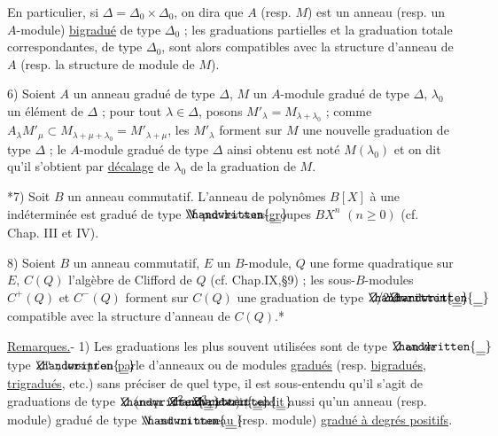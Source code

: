En particulier, si $\Delta=\Delta_0\times\Delta_0$, on dira que $A$ (resp. $M$) est un anneau (resp. un $A$-module) \uline{bigradué} de type $\Delta_0$ ; les graduations partielles et la graduation totale correspondantes, de type $\Delta_0$, sont alors compatibles avec la structure d'anneau de $A$ (resp. la structure de module de $M$).

6) Soient $A$ un anneau gradué de type $\Delta$, $M$ un $A$-module gradué de type $\Delta$, $\lambda_0$ un élément de $\Delta$ ; pour tout $\lambda\in\Delta$, posons $M'_\lambda=M_{\lambda+\lambda_0}$ ; comme $A_\lambda M'_\mu\subset M_{\lambda+\mu+\lambda_0}=M'_{\lambda+\mu}$, les $M'_\lambda$ forment sur $M$ une nouvelle graduation de type $\Delta$ ; le $A$-module gradué de type $\Delta$ ainsi obtenu est noté $M(\lambda_0)$ et on dit qu'il s'obtient par \uline{décalage} de $\lambda_0$ de la graduation de $M$.

*7) Soit $B$ un anneau commutatif. L'anneau de polynômes $B[X]$ à une indéterminée est gradué de type $\rlap{\ensuremath{\handwritten{\underline{\underline{\phantom{N}}}}}}N$ par les sous-groupes $BX^n$ $(n\geq 0)$ (cf. Chap. III et IV).

8) Soient $B$ un anneau commutatif, $E$ un $B$-module, $Q$ une forme quadratique sur $E$, $C(Q)$ l'algèbre de Clifford de $Q$ (cf. Chap.IX,\S{}9) ; les sous-$B$-modules $C^+(Q)$ et $C^-(Q)$ forment sur $C(Q)$ une graduation de type $\rlap{\ensuremath{\handwritten{\underline{\underline{\phantom{Z}}}}}}Z/2\rlap{\ensuremath{\handwritten{\underline{\underline{\phantom{Z}}}}}}Z$ compatible avec la structure d'anneau de $C(Q)$.*

\uline{Remarques.}- 1) Les graduations les plus souvent utilisées sont de type $\rlap{\ensuremath{\handwritten{\underline{\underline{\phantom{Z}}}}}}Z$ ou de type $\rlap{\ensuremath{\handwritten{\underline{\underline{\phantom{Z}}}}}}Z^n$ ; lorsqu'on parle d'anneaux ou de modules \uline{gradués} (resp. \uline{bigradués}, \uline{trigradués}, etc.) sans préciser de quel type, il est sous-entendu qu'il s'agit de graduations de type $\rlap{\ensuremath{\handwritten{\underline{\underline{\phantom{Z}}}}}}Z$ (resp. $\rlap{\ensuremath{\handwritten{\underline{\underline{\phantom{Z}}}}}}Z^2$, $\rlap{\ensuremath{\handwritten{\underline{\underline{\phantom{Z}}}}}}Z^3$, etc.) ; on dit aussi qu'un anneau (resp. module) gradué de type $\rlap{\ensuremath{\handwritten{\underline{\underline{\phantom{N}}}}}}N$ est un anneau (resp. module) \uline{gradué à degrés positifs}.

